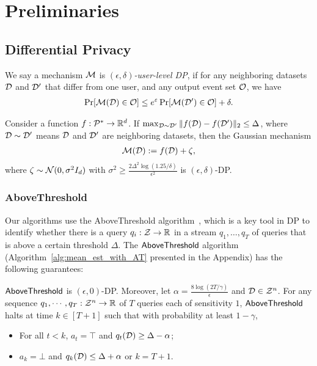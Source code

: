 

\newpage
\section{Preliminaries}
\label{subsec:prel}


\subsection{Differential Privacy}
\begin{definition}
    We say a mechanism $\mathcal{M}$ is \emph{$(\epsilon,\delta)$-user-level DP}, if for any neighboring datasets $\mathcal{D}$ and $\mathcal{D}'$ that differ from one user, and any output event set $\mathcal{O}$, we have
    \begin{align*}
        \Pr[\mathcal{M}(\mathcal{D})\in\mathcal{O}]\le e^\varepsilon\Pr[\mathcal{M}(\mathcal{D}')\in\mathcal{O}]+\delta.
    \end{align*}
\end{definition}

\begin{proposition}
\label{prop:GM}
Consider a function $f:\mathcal{P}^*\to\mathbb{R}^d$.
If $\max_{\mathcal{D}\sim\mathcal{D}'}\|f(\mathcal{D})-f(\mathcal{D}')\|_2\le \Delta$, where $\mathcal{D}\sim\mathcal{D}'$ means $\mathcal{D}$ and $\mathcal{D}'$ are neighboring datasets, then the Gaussian mechanism
\begin{align*}
    \mathcal{M}(\mathcal{D}):= f(\mathcal{D})+\zeta,
\end{align*}
where $\zeta\sim\mathcal{N}(0,\sigma^2I_d)$ with $\sigma^2\ge \frac{2\Delta^2\log(1.25/\delta)}{\epsilon^2}$ is $(\epsilon,\delta)$-DP.
\end{proposition}

\subsubsection{AboveThreshold}
Our algorithms use the AboveThreshold algorithm~\citep{DR14},  which is a key tool in DP to identify whether there is a query $q_i: \mathcal{Z} \to \mathbb{R}$ in a stream $q_1,\dots,q_T$ of queries 
 that is above a certain threshold $\Delta$. 
The $\mathsf{AboveThreshold}$ algorithm (Algorithm~\ref{alg:mean_est_with_AT} presented in the Appendix) has the following guarantees:

\begin{lemma}
\label{thm:Above_Threshold}
    $\mathsf{AboveThreshold}$ is $(\epsilon,0)$-DP.
    Moreover, let $\alpha=\frac{8\log(2T/\gamma)}{\epsilon}$ and $\mathcal{D} \in \mathcal{Z}^n$. For any sequence $q_1,\cdots,q_T : \mathcal{Z}^n \to \mathbb{R}$ of $T$ queries each of sensitivity $1$, $\mathsf{AboveThreshold}$ halts at time $k \in [T+1]$ such that with probability at least $1-\gamma$,
    \begin{itemize}
        \item For all $t < k$, $a_t =\top$ and $q_t(\mathcal{D}) \ge \Delta - \alpha$;
        \item $a_k = \bot$ and $q_k(\mathcal{D}) \le \Delta + \alpha$ or $k = T+1$.
    \end{itemize} %
\end{lemma}


